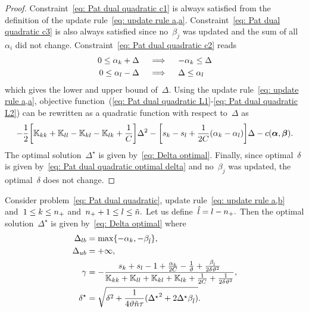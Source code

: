 \begin{proof}
  Constraint~\eqref{eq: Pat dual quadratic c1} is always satisfied from the definition of the update rule~\eqref{eq: update rule a,a}. Constraint~\eqref{eq: Pat dual quadratic c3} is also always satisfied since no~$\beta_j$ was updated and the sum of all~$\alpha_i$ did not change. Constraint~\eqref{eq: Pat dual quadratic c2} reads
  \begin{align*}
    0 \leq \alpha_k + \Delta
    & \quad \implies \quad
    - \alpha_k \leq \Delta \\
    0 \leq \alpha_l - \Delta
    & \quad \implies \quad
    \Delta \leq \alpha_l
  \end{align*}
  which gives the lower and upper bound of~$\Delta.$ Using the update rule~\eqref{eq: update rule a,a}, objective function~(\ref{eq: Pat dual quadratic L1}-\ref{eq: Pat dual quadratic L2}) can be rewritten as a quadratic function with respect to~$\Delta$ as
  \begin{equation*}
    - \frac{1}{2} \Brac[s]{\K_{kk} + \K_{ll} - \K_{kl} - \K_{lk} + \frac{1}{C}} \Delta^2
    - \Brac[s]{s_k - s_l + \frac{1}{2C}(\alphak - \alphal)} \Delta
    - c(\bm{\alpha}, \bm{\beta}).
  \end{equation*}
  The optimal solution~$\Delta^{\star}$ is given by~\eqref{eq: Delta optimal}. Finally, since optimal~$\delta$ is given by~\eqref{eq: Pat dual quadratic optimal delta} and no~$\beta_j$ was updated, the optimal~$\delta$ does not change.
\end{proof}

\begin{lemma}
  Consider problem~\eqref{eq: Pat dual quadratic}, update rule~\eqref{eq: update rule a,b} and~$1 \leq k \leq n_{+}$ and~$n_{+} + 1 \leq l \leq \tilde{n}.$ Let us define~$\hat{l} = l - n_{+}.$ Then the optimal solution~$\Delta^{\star}$ is given by~\eqref{eq: Delta optimal} where
  \begin{align*}
    \Delta_{lb} & = \max\{- \alpha_k, - \beta_{\hat{l}}\}, \\
    \Delta_{ub} & = +\infty, \\
    \gamma      & = -\frac{s_k + s_l  - 1 + \frac{\alpha_k}{2C} - \frac{1}{\vartheta} + \frac{\beta_{\hat{l}}}{2 \delta \vartheta^2}}{\mathbb{K}_{kk} + \mathbb{K}_{ll} + \mathbb{K}_{kl} + \mathbb{K}_{lk} + \frac{1}{2C} + \frac{1}{2 \delta \vartheta^2}}, \\
    \delta^{\star}  & = \sqrt{\delta^2 + \frac{1}{4 \vartheta \tilde{n} \tau}({\Delta^{\star}}^2 + 2 \Delta^{\star} \beta_{\hat{l}})}.
  \end{align*}
\end{lemma}

